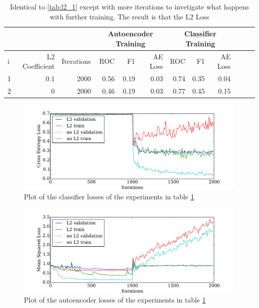    \begin{table}[!h] {\small \centering
      \begin{tabular}{lrrrrrrrrrrr}
        &&&   \multicolumn{3}{|c|}{Autoencoder Training} &  \multicolumn{3}{c|}{Classifier Training}    \\
      \hline
       i &   L2 Coefficient &   Iterations &   ROC&F1&AE Loss & ROC & F1 & AE Loss \\
      \hline
       1 &       0.1 & 2000 &    0.56 &   0.19 &     0.03 &    0.74 &   0.35 &     0.04\\
       2 &       0   & 2000 &    0.46 &   0.19 &     0.03 &    0.77 &   0.45 &     0.15\\
      \hline
    \end{tabular}
    \caption{Identical to \ref{tab:l2_1} except with more iterations to invetigate what happens with further training. The result is that
    the L2 Loss }
    \label{tab:l2_2} }
    \end{table}

    \begin{figure}[!h]
    \centering
    \includegraphics[width =0.8\hsize]{figures/l2.pdf}
    \caption{Plot of the classifier losses of the experiments in table \ref{tab:l2_2} }
    \label{fig:l2_1}
    \end{figure}

    \begin{figure}[!h]
    \centering
    \includegraphics[width =0.8\hsize]{figures/l2_auto.pdf}
    \caption{Plot of the autoencoder losses of the experiments in table \ref{tab:l2_2} }
    \label{fig:l2_2}
    \end{figure}

